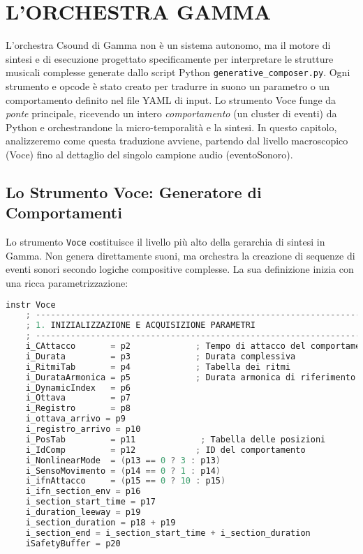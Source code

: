 
\section{L'ORCHESTRA GAMMA}
L'orchestra Csound di Gamma non è un sistema autonomo, ma il motore di sintesi e di esecuzione progettato specificamente per interpretare le strutture musicali complesse generate dallo script Python \texttt{generative\_composer.py}. Ogni strumento e opcode è stato creato per tradurre in suono un parametro o un comportamento definito nel file YAML di input. Lo strumento Voce funge da \textit{ponte} principale, ricevendo un intero \textit{comportamento} (un cluster di eventi) da Python e orchestrandone la micro-temporalità e la sintesi. In questo capitolo, analizzeremo come questa traduzione avviene, partendo dal livello macroscopico (Voce) fino al dettaglio del singolo campione audio (eventoSonoro).
\subsection{Lo Strumento Voce: Generatore di Comportamenti}
Lo strumento \texttt{Voce} costituisce il livello più alto della gerarchia di sintesi in Gamma. Non genera direttamente suoni, ma orchestra la creazione di sequenze di eventi sonori secondo logiche compositive complesse. La sua definizione inizia con una ricca parametrizzazione:

\begin{lstlisting}[language=C]
instr Voce
    ; -----------------------------------------------------------------------
    ; 1. INIZIALIZZAZIONE E ACQUISIZIONE PARAMETRI
    ; -----------------------------------------------------------------------
    i_CAttacco       = p2             ; Tempo di attacco del comportamento
    i_Durata         = p3             ; Durata complessiva
    i_RitmiTab       = p4             ; Tabella dei ritmi
    i_DurataArmonica = p5             ; Durata armonica di riferimento
    i_DynamicIndex   = p6         
    i_Ottava         = p7             
    i_Registro       = p8             
    i_ottava_arrivo = p9
    i_registro_arrivo = p10
    i_PosTab         = p11             ; Tabella delle posizioni
    i_IdComp         = p12            ; ID del comportamento
    i_NonlinearMode  = (p13 == 0 ? 3 : p13)
    i_SensoMovimento = (p14 == 0 ? 1 : p14) 
    i_ifnAttacco     = (p15 == 0 ? 10 : p15)
    i_ifn_section_env = p16 
    i_section_start_time = p17
    i_duration_leeway = p19
    i_section_duration = p18 + p19
    i_section_end = i_section_start_time + i_section_duration
    iSafetyBuffer = p20
\end{lstlisting}


